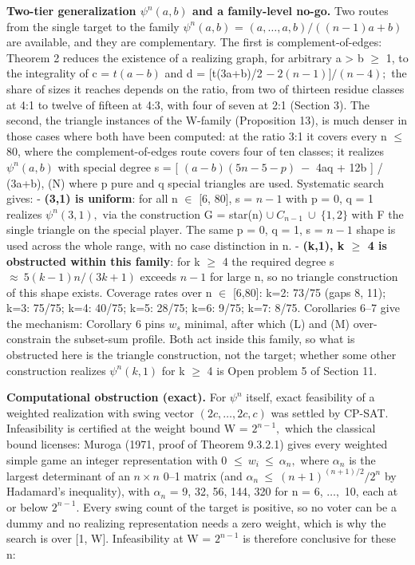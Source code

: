 \documentclass[
]{article}
\begin{document}
\textbf{Two-tier generalization \(\psi^n(a,b)\) and a family-level
no-go.} Two routes from the single target to the family \(\psi^n(a,b)\)
= \((a,\dots,a,b)/((n-1)a+b)\) are available, and they are
complementary. The first is complement-of-edges: Theorem 2 reduces the
existence of a realizing graph, for arbitrary a \textgreater{} b \(\ge\)
1, to the integrality of c = \(t(a-b)\) and d = {[}t(3a+b)/2
\(-\ 2(n-1)]/(n-4);\) the share of sizes it reaches depends on the
ratio, from two of thirteen residue classes at 4:1 to twelve of fifteen
at 4:3, with four of seven at 2:1 (Section 3). The second, the triangle
instances of the W-family (Proposition 13), is much denser in those
cases where both have been computed: at the ratio 3:1 it covers every n
\(\le\) 80, where the complement-of-edges route covers four of ten
classes; it realizes \(\psi^n(a,b)\) with special degree s = {[}
\((a-b)(5n-5-p)\ -\) 4aq + 12b {]} / (3a+b), (N) where p pure and q
special triangles are used. Systematic search gives: - \textbf{(3,1) is
uniform}: for all n \(\in\) {[}6, 80{]}, s = \(n-1\) with p = 0, q = 1
realizes \(\psi^n(3,1),\) via the construction G = star(n)
\(\cup\ C_{n-1}\ \cup\ \{1,2\}\) with F the single triangle on the
special player. The same p = 0, q = 1, s = \(n-1\) shape is used across
the whole range, with no case distinction in n. - \textbf{(k,1), k
\(\ge\) 4 is obstructed within this family}: for k \(\ge\) 4 the
required degree s \(\approx\ 5(k-1)n/(3k+1)\) exceeds \(n-1\) for large
n, so no triangle construction of this shape exists. Coverage rates over
n \(\in\) {[}6,80{]}: k=2: 73/75 (gaps 8, 11); k=3: 75/75; k=4: 40/75;
k=5: 28/75; k=6: 9/75; k=7: 8/75. Corollaries 6--7 give the mechanism:
Corollary 6 pins \(w_s\) minimal, after which (L) and (M) over-constrain
the subset-sum profile. Both act inside this family, so what is
obstructed here is the triangle construction, not the target; whether
some other construction realizes \(\psi^n(k,1)\) for k \(\ge\) 4 is Open
problem 5 of Section 11.

\textbf{Computational obstruction (exact).} For \(\psi^n\) itself, exact
feasibility of a weighted realization with swing vector
\((2c,\dots,2c,c)\) was settled by CP-SAT. Infeasibility is certified at
the weight bound W = \(2^{n-1},\) which the classical bound licenses:
Muroga (1971, proof of Theorem 9.3.2.1) gives every weighted simple game
an integer representation with 0 \(\le\ w_i\ \le\ \alpha_n,\) where
\(\alpha_n\) is the largest determinant of an \(n\times n\) 0--1 matrix
(and \(\alpha_n\ \le\ (n+1)^{(n+1)/2}/2^n\) by Hadamard's inequality),
with \(\alpha_n\) = 9, 32, 56, 144, 320 for n = 6, \(\dots,\) 10, each
at or below \(2^{n-1}.\) Every swing count of the target is positive, so
no voter can be a dummy and no realizing representation needs a zero
weight, which is why the search is over {[}1, W{]}. Infeasibility at W =
\(2^{n-1}\) is therefore conclusive for these n:
\end{document}
